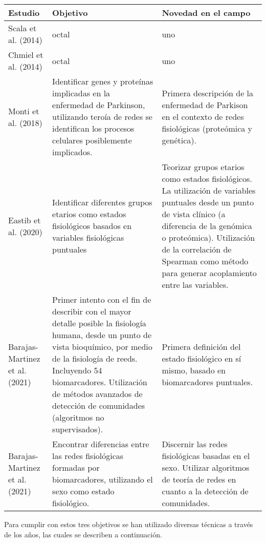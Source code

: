 \documentclass[twoside,twocolumn]{article}
\begin{document}
\begin{center}
  \begin{tabular}{|lp{5cm}p{5cm}|}
    \hline
    Estudio & Objetivo & Novedad en el campo \\
    \hline
    Scala et al. (2014) \cite{scala2014complex}& octal & uno
    \\\hline
    Chmiel et al. (2014) \cite{chmiel2014spreading} & octal & uno
    \\\hline
    Monti et al. (2018) \cite{monti2018network} &
    Identificar genes y proteínas implicadas en la enfermedad de Parkinson, utilizando teroía de redes se identifican los procesos celulares posiblemente implicados. & Primera descripción de la enfermedad de Parkison en el contexto de redes fisiológicas (proteómica y genética).
    \\ \hline
    Eastib et al. (2020) \cite{easton2020metabolic} &
    Identificar diferentes grupos etarios como estados fisiológicos basados en variables fisiológicas puntuales
    &
    Teorizar grupos etarios como estados fisiológicos.
    La utilización de variables puntuales desde un punto de vista clínico (a diferencia de la genómica o proteómica).
    Utilización de la correlación de Spearman como método para generar acoplamiento entre las variables.
    \\\hline
    Barajas-Martinez et al. (2021) \cite{barajas2021physiological}
    &
    Primer intento con el fin de describir con el mayor detalle posible la fisiología humana, desde un punto de vista bioquímico, por medio de la fisiología de reeds. Incluyendo 54 biomarcadores.
    Utilización de métodos avanzados de detección de comunidades (algoritmos no supervisados).
    &
    Primera definición del estado fisiológico en sí mismo, basado en biomarcadores puntuales.
    \\\hline
    Barajas-Martinez et al. (2021) \cite{barajas2021sex}
    &
    Encontrar diferencias entre las redes fisiológicas formadas por biomarcadores, utilizando el sexo como estado fisiológico.
    &
    Discernir las redes fisiológicas basadas en el sexo.
    Utilizar algoritmos de teoría de redes en cuanto a la detección de comunidades.
    \\\hline
  \end{tabular}
\end{center}
\twocolumn
Para cumplir con estos tres objetivos se han utilizado diversas técnicas a través de los años, las cuales se describen a continuación.
\end{document}
